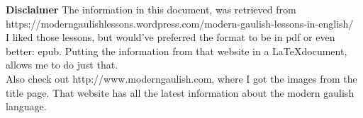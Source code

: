 \begin{center}
\textbf{Disclaimer}
The information in this document, was retrieved from https://moderngaulishlessons.wordpress.com/modern-gaulish-lessons-in-english/\\

\noindent I liked those lessons, but would've preferred the format to be in pdf or even better: epub. Putting the information from that website in a \LaTeX document, allows me to do just that.\\

\noindent Also check out http://www.moderngaulish.com, where I got the images from the title page. That website has all the latest information about the modern gaulish language.
\end{center}
